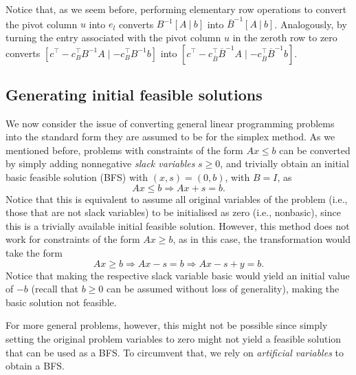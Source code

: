 Notice that, as we seem before, performing elementary row operations to convert the pivot column $u$ into $e_l$ converts $B^{-1}[A ~|~ b]$ into $\overline{B}^{-1}[A ~|~ b]$. Analogously, by turning the entry associated with the pivot column $u$ in the zeroth row to zero converts $[c^\top - c_B^\top B^{-1}A \mid -c_B^\top B^{-1}b]$ into $[c^\top - c_{\overline{B}}^\top \overline{B}^{-1}A \mid -c_{\overline{B}}^\top \overline{B}^{-1}b]$.


\subsection{Generating initial feasible solutions} 

We now consider the issue of converting general linear programming problems into the standard form they are assumed to be for the simplex method. As we mentioned before, problems with constraints of the form $Ax \le b$ can be converted by simply adding nonnegative \emph{slack variables} $s \geq 0$, and trivially obtain an initial basic feasible solution (BFS) with $(x,s) = (0,b)$, with $B = I$, as
%
\begin{equation*}
		Ax \leq b \Rightarrow Ax + s = b.
\end{equation*}
%
Notice that this is equivalent to assume all original variables of the problem (i.e., those that are not slack variables) to be initialised as zero (i.e., nonbasic), since this is a trivially available initial feasible solution. However, this method does not work for constraints of the form $Ax \ge b$, as in this case, the transformation would take the form 
%
\begin{equation*}
	Ax \geq b \Rightarrow Ax - s = b \Rightarrow Ax - s + y = b.	
\end{equation*}
%
Notice that making the respective slack variable basic would yield an initial value of $-b$ (recall that $b \ge 0$ can be assumed without loss of generality), making the basic solution not feasible.

For more general problems, however, this might not be possible since simply setting the original problem variables to zero might not yield a feasible solution that can be used as a BFS. To circumvent that, we rely on \emph{artificial variables} to obtain a BFS.

